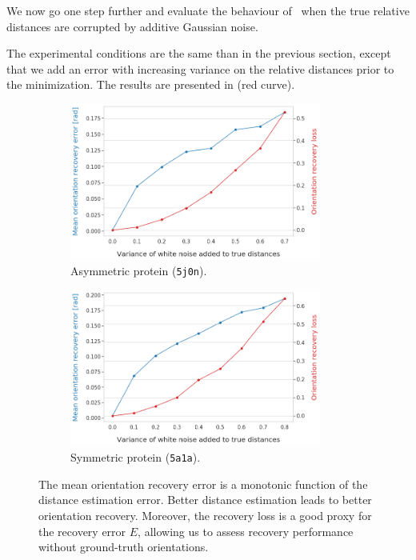 
We now go one step further and evaluate the behaviour of~ when the true relative distances are corrupted by  additive Gaussian noise.

The experimental conditions are the same than in the previous section, except that we add an error with increasing variance on the relative distances prior to the minimization.
The results are presented in  (red curve).


\begin{figure}
    \centering
    \begin{subfigure}[b]{0.48\textwidth}
        \includegraphics[height=5.15cm]{images/5j0n_perfect_noisy_ar_aa.png}
        \caption{Asymmetric protein (\texttt{5j0n}).}
    \end{subfigure}
    \hfill
    \begin{subfigure}[b]{0.50\textwidth}
    \centering
        \includegraphics[height=5.15cm]{images/5a1a_perfect_noisy_ar_aa.png}
        \caption{Symmetric protein (\texttt{5a1a}).}
    \end{subfigure}
    \caption{
    The mean orientation recovery error  is a monotonic function of the distance estimation error.
        Better distance estimation leads to better orientation recovery.
        Moreover, the recovery loss  is a good proxy for the recovery error $E$, allowing us to assess recovery performance without ground-truth orientations.
}
    \label{fig:perfect-with-noise-ar-aa}
\end{figure}

